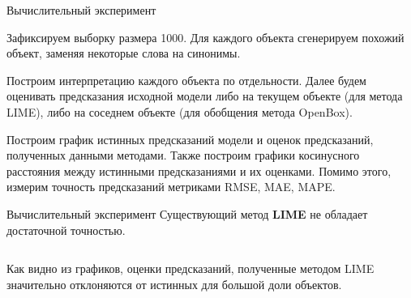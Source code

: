 \documentclass{beamer}
\begin{document}
\begin{frame}{Вычислительный эксперимент}

Зафиксируем выборку размера 1000. Для каждого объекта сгенерируем похожий объект, заменяя некоторые слова на синонимы.
\bigskip

Построим интерпретацию каждого объекта по отдельности. Далее будем оценивать предсказания исходной модели либо на текущем объекте (для метода LIME), либо на соседнем объекте (для обобщения метода OpenBox).
\bigskip

Построим график истинных предсказаний модели и оценок предсказаний, полученных данными методами. Также построим графики косинусного расстояния между истинными предсказаниями и их оценками. Помимо этого, измерим точность предсказаний метриками RMSE, MAE, MAPE.
\end{frame}
\begin{frame}{Вычислительный эксперимент}
Существующий метод \textbf{LIME} не обладает достаточной точностью.
\begin{columns}[c]


\end{columns}
Как видно из графиков, оценки предсказаний, полученные методом LIME значительно отклоняются от истинных для большой доли объектов.

\end{frame}
\end{document}
